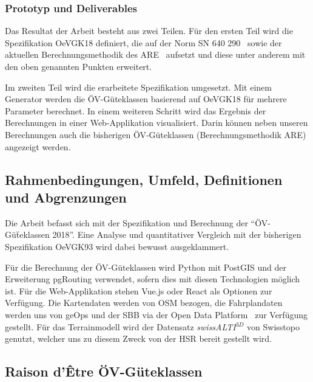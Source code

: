 \subsubsection{Prototyp und Deliverables}
\label{Ziele und Unterziele:Prototyp und Deliverables}

Das Resultat der Arbeit besteht aus zwei Teilen.
Für den ersten Teil wird die Spezifikation \gls{OeVGK18} definiert, die auf der Norm SN 640 290~\cite{sn640290} sowie der aktuellen Berechnungsmethodik des \acs{ARE}~\cite{berechnung_are} aufsetzt und diese unter anderem mit den oben genannten Punkten erweitert.

Im zweiten Teil wird die erarbeitete Spezifikation umgesetzt.
Mit einem Generator werden die \acs{ÖV}-Güteklassen basierend auf \gls{OeVGK18} für mehrere Parameter berechnet.
In einem weiteren Schritt wird das Ergebnis der Berechnungen in einer Web-Applikation visualisiert.
Darin können neben unseren Berechnungen auch die bisherigen \acs{ÖV}-Güteklassen (Berechnungsmethodik \acs{ARE}) angezeigt werden.

\subsection{Rahmenbedingungen, Umfeld, Definitionen und Abgrenzungen}
\label{Einführung:Rahmenbedingungen, Umfeld, Definitionen, Abgrenzungen}

Die Arbeit befasst sich mit der Spezifikation und Berechnung der "`ÖV-Güẗeklassen 2018"'.
Eine Analyse und quantitativer Vergleich mit der bisherigen Spezifikation \gls{OeVGK93} wird dabei bewusst ausgeklammert.

Für die Berechnung der ÖV-Güteklassen wird Python mit PostGIS und der Erweiterung pgRouting verwendet, sofern dies mit diesen Technologien möglich ist.
Für die Web-Applikation stehen Vue.js oder React als Optionen zur Verfügung. Die Kartendaten werden von \ac{OSM} bezogen, die Fahrplandaten werden uns von geOps und der SBB via der Open Data Platform~\cite{sbb_open_transport_data} zur Verfügung gestellt.
Für das \gls{Terrainmodell} wird der Datensatz \emph{swissALTI$^{3D}$} von Swisstopo~\cite{swissalti3d_swisstopo} genutzt, welcher uns zu diesem Zweck von der HSR bereit gestellt wird.

\subsection{Raison d'Être ÖV-Güteklassen}
\label{Rahmenbedingungen, Umfeld, Definitionen, Abgrenzungen:Raison d’Être ÖV-Güteklassen}

